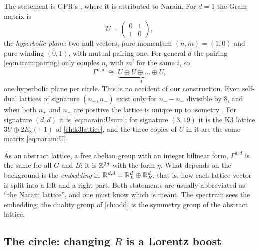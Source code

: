 The statement is GPR's , where it is
attributed to Narain. For $d=1$ the Gram matrix is
\begin{equation}\label{eq:narain:U}
 U=\begin{pmatrix}0&1\\1&0\end{pmatrix},
\end{equation}
the \emph{hyperbolic plane}: two null vectors, pure momentum
$(n,m)=(1,0)$ and pure winding $(0,1)$, with mutual pairing one. For general $d$ the pairing
\eqref{eq:narain:pairing} only couples $n_i$ with $m^i$ for the same $i$, so
\begin{equation}\label{eq:narain:Usum}
 \Gamma^{d,d}\;\cong\;\underbrace{U\oplus U\oplus\dots\oplus U}_{d},
\end{equation}
one hyperbolic plane per circle. This is no accident of our construction. Even self-dual
lattices of signature $(n_+,n_-)$ exist only for $n_+-n_-$ divisible by $8$, and when both
$n_+$ and $n_-$ are positive the lattice is unique up to isometry
. For signature $(d,d)$ it is \eqref{eq:narain:Usum}; for
signature $(3,19)$ it is the K3 lattice $3U\oplus2E_8(-1)$ of \cref{ch:k3lattice}, and the
three copies of $U$ in it are the same matrix \eqref{eq:narain:U}.

\begin{pitfallbox}
As an abstract lattice, a free abelian group with an integer bilinear form, $\Gamma^{d,d}$ is
the same for all $G$ and $B$: it is $\mathbb{Z}^{2d}$ with the form $\eta$. What depends on the
background is the \emph{embedding} in $\mathbb{R}^{d,d}=\mathbb{R}^d_L\oplus\mathbb{R}^d_R$, that is, how each lattice
vector is split into a left and a right part. Both statements are usually abbreviated as
``the Narain lattice'', and one must know which is meant. The spectrum sees the embedding; the
duality group of \cref{ch:odd} is the symmetry group of the abstract lattice.
\end{pitfallbox}

\subsection{The circle: changing \texorpdfstring{$R$}{R} is a Lorentz boost}

